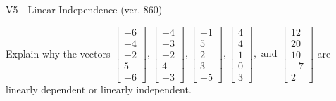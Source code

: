 \begin{exercise}
  \begin{exerciseTitle}V5 - Linear Independence (ver. 860)\end{exerciseTitle}
  \begin{exerciseStatement}
    Explain why the vectors \(\left[\begin{array}{r}
-6 \\
-4 \\
-2 \\
5 \\
-6
\end{array}\right] , \left[\begin{array}{r}
-4 \\
-3 \\
-2 \\
4 \\
-3
\end{array}\right] , \left[\begin{array}{r}
-1 \\
5 \\
2 \\
3 \\
-5
\end{array}\right] , \left[\begin{array}{r}
4 \\
4 \\
1 \\
0 \\
3
\end{array}\right] , \text{ and } \left[\begin{array}{r}
12 \\
20 \\
10 \\
-7 \\
2
\end{array}\right]\) are linearly dependent or linearly independent.	



\end{exerciseStatement}
\end{exercise}
